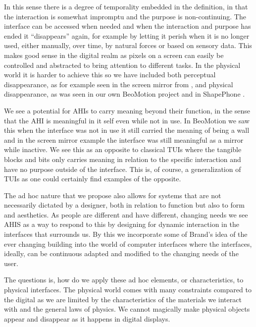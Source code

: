 In this sense there is a degree of temporality embedded in the definition, in that the interaction is somewhat impromptu and the purpose is non-continuing.
The interface can be accessed when needed and when the interaction and purpose has ended it ``disappears'' again, for example by letting it perish when it is no longer used, either manually, over time, by natural forces or based on sensory data.
This makes good sense in the digital realm as pixels on a screen can easily be controlled and abstracted to bring attention to different tasks.
In the physical world it is harder to achieve this so we have included both perceptual disappearance, as for example seen in the screen mirror from \citep{lynggaard2012had}, and physical disappearance, as was seen in our own BeoMotion project \citep{beomotionreportstefan, beomotionreporttore} and in ShapePhone \citep{follmer2012jamming}.

We see a potential for AHIs to carry meaning beyond their function, in the sense that the AHI is meaningful in it self even while not in use.
In BeoMotion we saw this when the interface was not in use it still carried the meaning of being a wall and in the screen mirror example the interface was still meaningful as a mirror while inactive.
We see this as an opposite to classical TUIs where the tangible blocks and bits only carries meaning in relation to the specific interaction and have no purpose outside of the interface. 
This is, of course, a generalization of TUIs as one could certainly find examples of the opposite. 

The ad hoc nature that we propose also allows for systems that are not necessarily dictated by a designer, both in relation to function but also to form and aesthetics.
As people are different and have different, changing needs we see AHIS as a way to respond to this by designing for dynamic interaction in the interfaces that surrounds us.
By this we incorporate some of Brand's idea of the ever changing building into the world of computer interfaces where the interfaces, ideally, can be continuous adapted and modified to the changing needs of the user.


The questions is, how do we apply these ad hoc elements, or characteristics, to physical interfaces.
The physical world comes with many constraints compared to the digital as we are limited by the characteristics of the materials we interact with and the general laws of physics.
We cannot magically make physical objects appear and disappear as it happens in digital displays.

